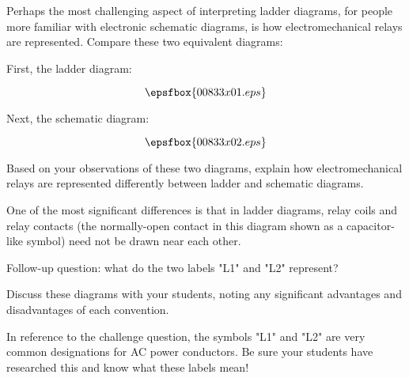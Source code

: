 

Perhaps the most challenging aspect of interpreting ladder diagrams, for people more familiar with electronic schematic diagrams, is how electromechanical relays are represented.  Compare these two equivalent diagrams:

\vskip 10pt

First, the ladder diagram:

$$\epsfbox{00833x01.eps}$$

\vskip 10pt

Next, the schematic diagram:

$$\epsfbox{00833x02.eps}$$

Based on your observations of these two diagrams, explain how electromechanical relays are represented differently between ladder and schematic diagrams.







One of the most significant differences is that in ladder diagrams, relay coils and relay contacts (the normally-open contact in this diagram shown as a capacitor-like symbol) need not be drawn near each other.

\vskip 10pt

Follow-up question: what do the two labels "L1" and "L2" represent?







Discuss these diagrams with your students, noting any significant advantages and disadvantages of each convention.

In reference to the challenge question, the symbols "L1" and "L2" are very common designations for AC power conductors.  Be sure your students have researched this and know what these labels mean!




